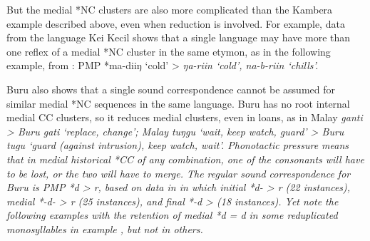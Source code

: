 But the medial *NC clusters are also more complicated than the
Kambera example described above,
even when reduction is involved.
For example, data from the  language
Kei Kecil shows that a single language may have more than one
reflex of a medial *NC cluster in the same etymon,
as in the following example,
from \citet{Grimes1991a}: PMP *ma-diiŋ ‘cold’ >
\it{ŋa-riin} ‘cold’, \it{na-b-riin} ‘chills’.

Buru also shows that a single sound correspondence cannot be
assumed for similar medial *NC sequences in the same language.
Buru has no root internal medial CC clusters,
so it reduces medial clusters,
even in loans, as in Malay \it{ganti} > Buru \it{gati} ‘replace,
change’; Malay \it{tuŋgu} ‘wait,
keep watch, guard’ > Buru \it{tugu} ‘guard (against intrusion), keep watch, wait’.
Phonotactic pressure means that in medial historical *CC of any
combination, one of the consonants will have to be lost,
or the two will have to merge.
The regular sound correspondence for Buru is PMP *d > \it{r},
based on data in \citet{GrimesGrimes2020} in which initial
*d- > \it{r} (22 instances),
medial *-d- > \it{r} (25 instances),
and final *-d > {\0} (18 instances).
Yet note the following examples with the retention of medial
*d = \it{d} in some reduplicated monosyllables in example ,
but not in others.



